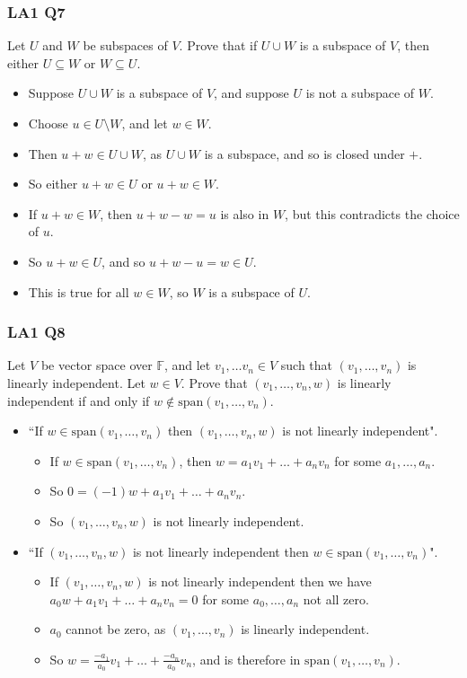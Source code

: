 \documentclass[handout]{beamer}
\newcommand{\bF}{\mathbb{F}}
\newcommand{\spa}{\mathrm{span}}
\begin{document}
\begin{frame}
\frametitle{LA1 Q7}
Let $U$ and $W$ be subspaces of $V$. Prove that if $U\cup W$ is a subspace of $V$, then either $U\subseteq W$ or $W\subseteq U$.
\vspace{0.5cm}
\begin{itemize}
\item Suppose $U\cup W$ is a subspace of $V$, and suppose $U$ is not a subspace of $W$. 
\item Choose $u\in U\setminus W$, and let $w\in W$. 
\item Then $u + w \in U\cup W$, as $U\cup W$ is a subspace, and so is closed under $+$. 
\item So either $u+w \in U$ or $u+w \in W$. 
\item If $u+w\in W$, then $u+w-w = u$ is also in $W$, but this contradicts the choice of $u$. 
\item So $u+w\in U$, and so $u+w-u = w\in U$. 
\item This is true for all $w\in W$, so $W$ is a subspace of $U$.
\end{itemize}
\end{frame}

\begin{frame}
\frametitle{LA1 Q8}
Let $V$ be vector space over $\bF$, and let $v_1,\ldots v_n\in V$ such that $(v_1,\ldots,v_n)$ is linearly independent. Let $w\in V$. Prove that $(v_1,\ldots,v_n, w)$ is linearly independent if and only if $w\not\in \spa(v_1,\ldots,v_n)$.
\begin{itemize}
\item ``If $w\in \spa(v_1,\ldots,v_n)$ then $(v_1,\ldots,v_n,w)$ is not linearly independent".
\begin{itemize}
\item If $w\in \spa(v_1,\ldots,v_n)$, then $w = a_1v_1+\ldots +a_n v_n$ for some $a_1,\ldots,a_n$.
\item So $0 = (-1)w + a_1v_1+\ldots +a_n v_n$.
\item So $(v_1,\ldots,v_n, w)$ is not linearly independent. 
\end{itemize}
\item ``If $(v_1,\ldots,v_n,w)$ is not linearly independent then $w\in \spa(v_1,\ldots,v_n)$".
\begin{itemize}
\item If $(v_1,\ldots,v_n, w)$ is not linearly independent then we have $a_0w + a_1v_1+\ldots + a_n v_n = 0$ for some $a_0,\ldots, a_n$ not all zero. 
\item $a_0$ cannot be zero, as $(v_1,\ldots,v_n)$ is linearly independent. 
\item So $w = \frac{-a_1}{a_0}v_1 + \ldots + \frac{-a_n}{a_0}v_n$, and is therefore in $\spa(v_1,\ldots,v_n)$. 
\end{itemize}
\end{itemize}
\end{frame}
\end{document}
